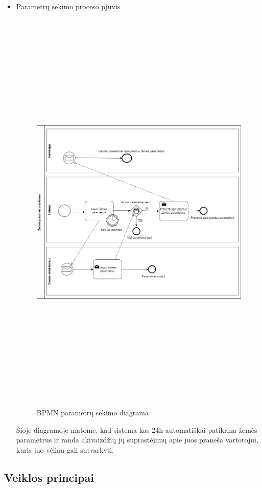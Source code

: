 \documentclass[oneside]{VUMIFPSkursinis}
\begin{document}
	\begin{itemize}
	\item Parametrų sekimo proceso pjūvis
	\begin{figure}[H]
		\centering	
	\includegraphics[width=18cm,height=20cm,keepaspectratio]{BPMN_ParametruSekimas.png}
	\caption{BPMN parametrų sekimo diagrama}
	\label{fig:BPMN_ParametruSekimas}
\end{figure}
Šioje diagramoje matome, kad sistema kas 24h automatiškai patikrina žemės parametrus ir randa akivaizdžių jų suprastėjimų apie juos praneša vartotojui, kuris juo vėliau gali sutvarkyti.
\end{itemize}

	\subsection{Veiklos principai}
\end{document}
